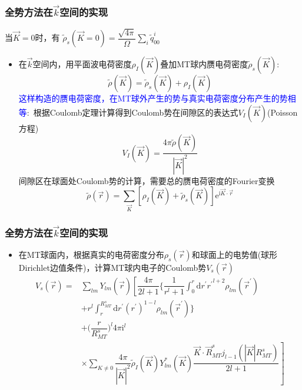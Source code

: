 \frame
{
	\frametitle{全势方法在$\vec k$空间的实现}
	当$\vec K=0$时，有
		$\tilde\rho_s(\vec K=0)=\dfrac{\sqrt{4\pi}}{\Omega}\sum\limits_i\tilde{q}_{00}^i$
\begin{itemize}
	\item 在$\vec k$空间内，用平面波电荷密度$\rho_I(\vec K)$叠加\textrm{MT}球内赝电荷密度$\tilde\rho_s(\vec K)$:
		\begin{displaymath}
			\tilde\rho(\vec K)=\tilde\rho_s(\vec K)+\rho_I(\vec K)
		\end{displaymath}
		\textcolor{blue}{这样构造的赝电荷密度，在\textrm{MT}球外产生的势与真实电荷密度分布产生的势相等}:~根据\textrm{Coulomb}定理计算得到\textrm{Coulomb}势在间隙区的表达式$V_I(\vec K)$(\textrm{Poisson}方程)
		\begin{displaymath}
			V_I(\vec K)=\dfrac{4\pi\tilde\rho(\vec K)}{|\vec K|^2}
		\end{displaymath}
	间隙区在球面处\textrm{Coulomb}势的计算，需要总的赝电荷密度的\textrm{Fourier}变换
	\begin{displaymath}
		\tilde\rho(\vec r)=\sum_{\vec K}[\rho_I(\vec K)+\tilde\rho_s(\vec K)]\mathrm{e}^{\mathrm{i}\vec K\cdot\vec r}
	\end{displaymath}
\end{itemize}
}

\frame
{
	\frametitle{全势方法在$\vec k$空间的实现}
\begin{itemize}
	\item 在\textrm{MT}球面内，根据真实的电荷密度分布$\rho_s(\vec r)$和球面上的电势值(球形\textrm{Dirichlet}边值条件)，计算\textrm{MT}球内电子的\textrm{Coulomb}势$V_s(\vec r)$
		\begin{displaymath}
			\begin{aligned}
				V_s(\vec r)=&\sum_{lm}Y_{lm}(\hat{\vec r})\left[\dfrac{4\pi}{2l+1}\bigg\{\dfrac1{r^l+1}\int_0^r\mathrm{d}r^{\prime}{r^{\prime}}^{l+2}\rho_{lm}(\vec r^{\prime})\right.\\
					&+r^l\int_r^{R_{MT}^s}\mathrm{d}r^{\prime}(r^{\prime})^{1-l}\rho_{lm}(\vec r^{\prime})\bigg\}\\
					&+\bigg(\dfrac r{R_{MT}^s}\bigg)^l4\pi\mathrm{i}^l\\
					&\times\sum_{K\neq0}\left.\dfrac{4\pi}{|\vec K|^2}\tilde\rho_I(\vec K)Y_{lm}^{\ast}(\vec K)\dfrac{\vec K\cdot\vec R_{MT}^sj_{l-1}(|\vec K|R_{MT}^s)}{2l+1}\right]
			\end{aligned}
		\end{displaymath}
\end{itemize}
}

